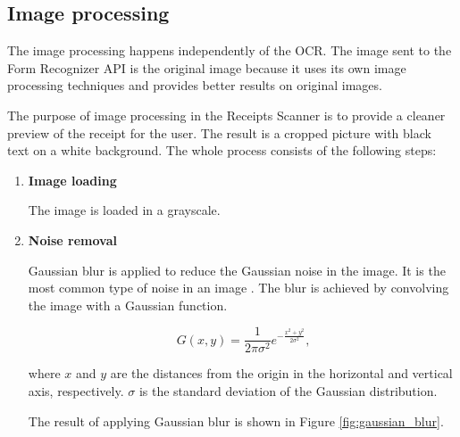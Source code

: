 \documentclass[
  printed, %
  table,   %
  oneside, %
  lof,     %
  lot,     %
]{fithesis3}
\begin{document}
\subsection{Image processing}
The image processing happens independently of the OCR. The image sent to the Form Recognizer API is the original image because it uses its own image processing techniques and provides better results on original images.

The purpose of image processing in the Receipts Scanner is to provide a cleaner preview of the receipt for the user. The result is a cropped picture with black text on a white background. The whole process consists of the following steps:

\begin{enumerate}
    \item \textbf{Image loading} 
    
    The image is loaded in a grayscale.
    
    \item \textbf{Noise removal} 

    Gaussian blur is applied to reduce the Gaussian noise in the image. It is the most common type of noise in an image \cite{Shreya2019OCRCNN}. The blur is achieved by convolving the image with a Gaussian function.
    
    \begin{equation}
    G(x,y) = \frac{1}{2\pi\sigma^2}e^{-\frac{x^2+y^2}{2\sigma^2}}\text{,}
    \end{equation}
    
    where $x$ and $y$ are the distances from the origin in the horizontal and vertical axis, respectively. $\sigma$ is the standard deviation of the Gaussian distribution. \cite{Shreya2019OCRCNN}
    
    The result of applying Gaussian blur is shown in Figure \ref{fig:gaussian_blur}.
    

\end{enumerate}
\end{document}
